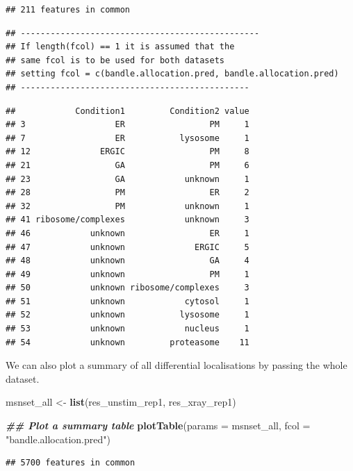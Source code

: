 \documentclass[9pt,a4paper,]{extarticle}
\newenvironment{Shaded}{\begin{snugshade}}{\end{snugshade}}
\newcommand{\AttributeTok}[1]{\textcolor[rgb]{0.13,0.29,0.53}{#1}}
\newcommand{\DocumentationTok}[1]{\textcolor[rgb]{0.56,0.35,0.01}{\textbf{\textit{#1}}}}
\newcommand{\FunctionTok}[1]{\textcolor[rgb]{0.13,0.29,0.53}{\textbf{#1}}}
\newcommand{\NormalTok}[1]{#1}
\newcommand{\OtherTok}[1]{\textcolor[rgb]{0.56,0.35,0.01}{#1}}
\newcommand{\StringTok}[1]{\textcolor[rgb]{0.31,0.60,0.02}{#1}}
\begin{document}
\begin{verbatim}
## 211 features in common
\end{verbatim}

\begin{verbatim}
## ------------------------------------------------
## If length(fcol) == 1 it is assumed that the
## same fcol is to be used for both datasets
## setting fcol = c(bandle.allocation.pred, bandle.allocation.pred)
## ----------------------------------------------
\end{verbatim}

\begin{verbatim}
##            Condition1         Condition2 value
## 3                  ER                 PM     1
## 7                  ER           lysosome     1
## 12              ERGIC                 PM     8
## 21                 GA                 PM     6
## 23                 GA            unknown     1
## 28                 PM                 ER     2
## 32                 PM            unknown     1
## 41 ribosome/complexes            unknown     3
## 46            unknown                 ER     1
## 47            unknown              ERGIC     5
## 48            unknown                 GA     4
## 49            unknown                 PM     1
## 50            unknown ribosome/complexes     3
## 51            unknown            cytosol     1
## 52            unknown           lysosome     1
## 53            unknown            nucleus     1
## 54            unknown         proteasome    11
\end{verbatim}

We can also plot a summary of all differential localisations by passing the
whole dataset.

\begin{Shaded}
\begin{Highlighting}[]
\NormalTok{msnset\_all }\OtherTok{\textless{}{-}} \FunctionTok{list}\NormalTok{(res\_unstim\_rep1, res\_xray\_rep1)}

\DocumentationTok{\#\# Plot a summary table}
\FunctionTok{plotTable}\NormalTok{(}\AttributeTok{params =}\NormalTok{ msnset\_all,}
          \AttributeTok{fcol =}  \StringTok{"bandle.allocation.pred"}\NormalTok{)}
\end{Highlighting}
\end{Shaded}

\begin{verbatim}
## 5700 features in common
\end{verbatim}
\end{document}
